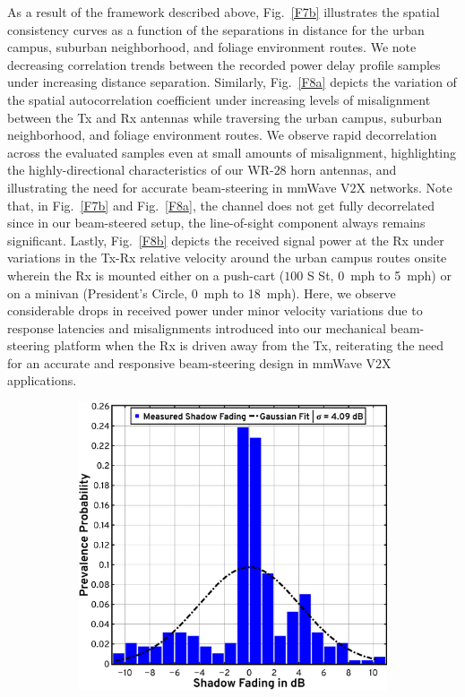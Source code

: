 \documentclass[12pt, draftcls, onecolumn]{IEEEtran}
\begin{document}
{As a result of the framework described above, Fig.~\ref{F7b} illustrates the spatial consistency curves as a function of the separations in distance for the urban campus, suburban neighborhood, and foliage environment routes. We note decreasing correlation trends between the recorded power delay profile samples under increasing distance separation. Similarly, Fig.~\ref{F8a} depicts the variation of the spatial autocorrelation coefficient under increasing levels of misalignment between the Tx and Rx antennas while traversing the urban campus, suburban neighborhood, and foliage environment routes. We observe rapid decorrelation across the evaluated samples even at small amounts of misalignment, highlighting the highly-directional characteristics of our WR-$28$ horn antennas, and illustrating the need for accurate beam-steering in mmWave V$2$X networks. Note that, in Fig.~\ref{F7b} and Fig.~\ref{F8a}, the channel does not get fully decorrelated since in our beam-steered setup, the line-of-sight component always remains significant. Lastly, Fig.~\ref{F8b} depicts the received signal power at the Rx under variations in the Tx-Rx relative velocity around the urban campus routes onsite wherein the Rx is mounted either on a push-cart ($100$ S St, \SI{0}{mph} to \SI{5}{mph}) or on a minivan (President's Circle, \SI{0}{mph} to \SI{18}{mph}). Here, we observe considerable drops in received power under minor velocity variations due to response latencies and misalignments introduced into our mechanical beam-steering platform when the Rx is driven away from the Tx, reiterating the need for an accurate and responsive beam-steering design in mmWave V$2$X applications.
\begin{figure} [t]
    \centering
    \begin{subfigure}{0.4965\linewidth}
        \centering
        \includegraphics[width=1.0\linewidth]{figs/urban_campus_shadow_fading_1.pdf}

\end{subfigure}
\end{figure}}
\end{document}
